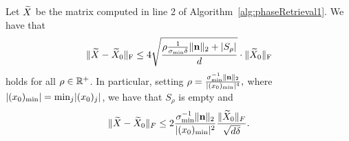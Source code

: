 
\begin{lemma}\label{lem:EtaBound}
Let $\widetilde{X}$ be the matrix computed in line 2 of Algorithm~\ref{alg:phaseRetrieval1}.  We have that \begin{equation}\| \widetilde{X} - \widetilde{X}_0 \|_{\rm F} \leq 4 \sqrt{\frac{\rho \frac{1}{\sigma_{\min} \delta} \| \mathbf n \|_2 + \left| S_\rho \right|}{d}} \cdot \| \widetilde{X}_0 \|_{\rm F}\label{eq:rho_bound}\end{equation} holds for all $\rho \in \mathbb{R}^+$.  In particular, setting $\rho = \frac{\sigma_{\min}^{-1} \lVert\mathbf n\rVert_2}{\lvert(x_0)_{\min}\rvert^4},$ where $\lvert(x_0)_{\min}\rvert = \min_j \lvert(x_0)_j\rvert$, we have that $S_\rho$ is empty and \begin{equation} \lVert\widetilde{X} - \widetilde{X}_0\rVert_F \le 2 \frac{\sigma_{\min}^{-1} \lVert\mathbf n\rVert_2}{\lvert(x_0)_{\min}\rvert^2} \frac{\lVert\widetilde{X}_0\rVert_F}{\sqrt{d \delta}}.\label{eq:empty_rho}\end{equation}
\end{lemma}

